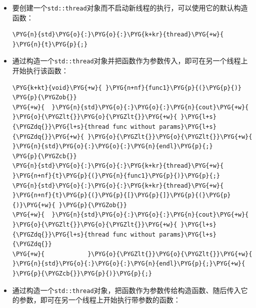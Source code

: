 \begin{itemize}
\item 要创建一个\texttt{std::\allowbreak{}thread}对象而不启动新线程的执行，可以使用它的默认构造函数：



\begin{codeblockbg}
\begin{Verbatim}[commandchars=\\\{\},breaklines=true,breakanywhere=true,fontsize=\codefont,xleftmargin=17bp]
\PYG{n}{std}\PYG{o}{:}\PYG{o}{:}\PYG{k+kr}{thread}\PYG{+w}{ }\PYG{n}{t}\PYG{p}{;}
\end{Verbatim}
\end{codeblockbg}



\item 通过构造一个\texttt{std::\allowbreak{}thread}对象并把函数作为参数传入，即可在另一个线程上开始执行该函数：



\begin{codeblockbg}
\begin{Verbatim}[commandchars=\\\{\},breaklines=true,breakanywhere=true,fontsize=\codefont,xleftmargin=17bp]
\PYG{k+kt}{void}\PYG{+w}{ }\PYG{n+nf}{func1}\PYG{p}{(}\PYG{p}{)}
\PYG{p}{\PYGZob{}}
\PYG{+w}{  }\PYG{n}{std}\PYG{o}{:}\PYG{o}{:}\PYG{n}{cout}\PYG{+w}{ }\PYG{o}{\PYGZlt{}}\PYG{o}{\PYGZlt{}}\PYG{+w}{ }\PYG{l+s}{\PYGZdq{}}\PYG{l+s}{thread func without params}\PYG{l+s}{\PYGZdq{}}\PYG{+w}{ }\PYG{o}{\PYGZlt{}}\PYG{o}{\PYGZlt{}}\PYG{+w}{ }\PYG{n}{std}\PYG{o}{:}\PYG{o}{:}\PYG{n}{endl}\PYG{p}{;}
\PYG{p}{\PYGZcb{}}
\PYG{n}{std}\PYG{o}{:}\PYG{o}{:}\PYG{k+kr}{thread}\PYG{+w}{ }\PYG{n+nf}{t}\PYG{p}{(}\PYG{n}{func1}\PYG{p}{)}\PYG{p}{;}
\PYG{n}{std}\PYG{o}{:}\PYG{o}{:}\PYG{k+kr}{thread}\PYG{+w}{ }\PYG{n+nf}{t}\PYG{p}{(}\PYG{p}{[}\PYG{p}{]}\PYG{p}{(}\PYG{p}{)}\PYG{+w}{ }\PYG{p}{\PYGZob{}}
\PYG{+w}{  }\PYG{n}{std}\PYG{o}{:}\PYG{o}{:}\PYG{n}{cout}\PYG{+w}{ }\PYG{o}{\PYGZlt{}}\PYG{o}{\PYGZlt{}}\PYG{+w}{ }\PYG{l+s}{\PYGZdq{}}\PYG{l+s}{thread func without params}\PYG{l+s}{\PYGZdq{}}
\PYG{+w}{            }\PYG{o}{\PYGZlt{}}\PYG{o}{\PYGZlt{}}\PYG{+w}{ }\PYG{n}{std}\PYG{o}{:}\PYG{o}{:}\PYG{n}{endl}\PYG{p}{;}\PYG{+w}{ }\PYG{p}{\PYGZcb{}}\PYG{p}{)}\PYG{p}{;}
\end{Verbatim}
\end{codeblockbg}



\item 通过构造一个\texttt{std::\allowbreak{}thread}对象，把函数作为参数传给构造函数、随后传入它的参数，即可在另一个线程上开始执行带参数的函数：



\end{itemize}
